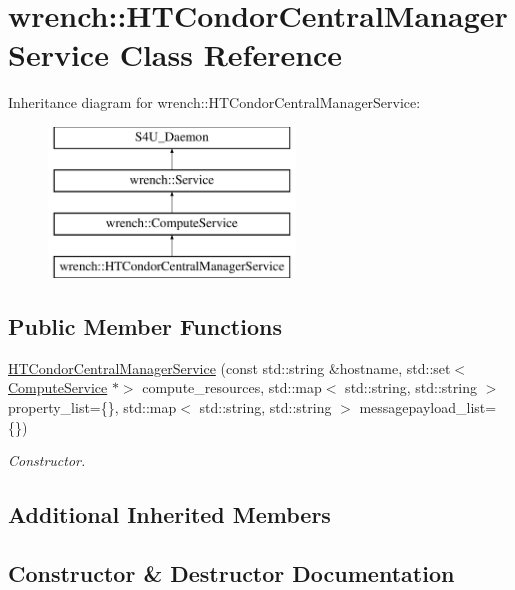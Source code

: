 \hypertarget{classwrench_1_1_h_t_condor_central_manager_service}{}\section{wrench\+:\+:H\+T\+Condor\+Central\+Manager\+Service Class Reference}
\label{classwrench_1_1_h_t_condor_central_manager_service}
Inheritance diagram for wrench\+:\+:H\+T\+Condor\+Central\+Manager\+Service\+:\begin{figure}[H]
\begin{center}
\leavevmode
\includegraphics[height=4.000000cm]{classwrench_1_1_h_t_condor_central_manager_service}
\end{center}
\end{figure}
\subsection*{Public Member Functions}
\begin{DoxyCompactItemize}
\item 
\hyperlink{classwrench_1_1_h_t_condor_central_manager_service_acc295c6ed3ed9d036d72a41150f4a05a}{H\+T\+Condor\+Central\+Manager\+Service} (const std\+::string \&hostname, std\+::set$<$ \hyperlink{classwrench_1_1_compute_service}{Compute\+Service} $\ast$$>$ compute\+\_\+resources, std\+::map$<$ std\+::string, std\+::string $>$ property\+\_\+list=\{\}, std\+::map$<$ std\+::string, std\+::string $>$ messagepayload\+\_\+list=\{\})
\begin{DoxyCompactList}\small\item\em Constructor. \end{DoxyCompactList}\end{DoxyCompactItemize}
\subsection*{Additional Inherited Members}


\subsection{Constructor \& Destructor Documentation}
\mbox{\label{classwrench_1_1_h_t_condor_central_manager_service_acc295c6ed3ed9d036d72a41150f4a05a}} 
